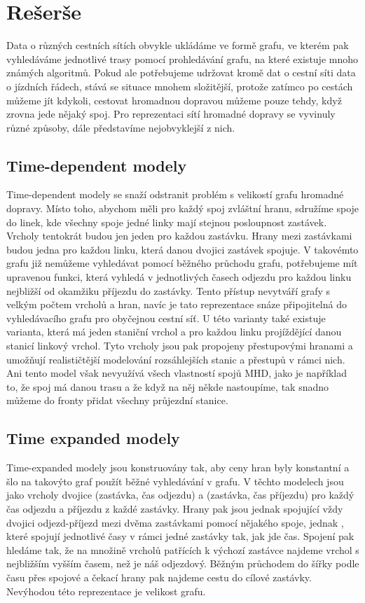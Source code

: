 \chapter{Rešerše}
Data o různých cestních sítích obvykle ukládáme ve formě grafu, ve kterém pak
vyhledáváme jednotlivé trasy pomocí prohledávání grafu, na které existuje mnoho
známých algoritmů. Pokud ale potřebujeme udržovat kromě dat o cestní síti data o
jízdních řádech, stává se situace mnohem složitější, protože zatímco po cestách
můžeme jít kdykoli, cestovat hromadnou dopravou můžeme pouze tehdy, když zrovna
jede nějaký spoj. Pro reprezentaci sítí hromadné dopravy se vyvinuly různé
způsoby, dále představíme nejobvyklejší z nich.

\section{Time-dependent modely}
Time-dependent modely \cite{time-dependent} se snaží odstranit problém s
velikostí grafu hromadné dopravy. Místo toho, abychom měli pro každý spoj
zvláštní hranu, sdružíme spoje do linek, kde všechny spoje jedné linky mají
stejnou posloupnost zastávek. Vrcholy tentokrát budou jen jeden pro každou
zastávku. Hrany mezi zastávkami budou jedna pro každou linku, která danou
dvojici zastávek spojuje. V takovémto grafu již nemůžeme vyhledávat pomocí
běžného průchodu grafu, potřebujeme mít upravenou funkci, která vyhledá v
jednotlivých časech odjezdu pro každou linku nejbližší od okamžiku příjezdu do
zastávky. Tento přístup nevytváří grafy s velkým počtem vrcholů a hran, navíc je
tato reprezentace snáze připojitelná do vyhledávacího grafu pro obyčejnou cestní
síť. U této varianty také existuje varianta, která má jeden staniční vrchol a
pro každou linku projíždějící danou stanicí linkový vrchol. Tyto vrcholy jsou
pak propojeny přestupovými hranami a umožňují realističtější modelování
rozsáhlejších stanic a přestupů v rámci nich. Ani tento model však nevyužívá
všech vlastností spojů MHD, jako je například to, že spoj má danou trasu a že
když na něj někde nastoupíme, tak snadno můžeme do fronty přidat všechny
průjezdní stanice.  

\section{Time expanded modely}
Time-expanded modely \cite{time-expanded} jsou konstruovány tak, aby ceny hran
byly konstantní a šlo na takovýto graf použít běžné vyhledávání v grafu. V
těchto modelech jsou jako vrcholy dvojice (zastávka, čas odjezdu) a (zastávka,
čas příjezdu) pro každý čas odjezdu a příjezdu z každé zastávky. Hrany pak
jsou jednak  spojující vždy dvojici odjezd-příjezd mezi dvěma
zastávkami pomocí nějakého spoje, jednak , které spojují jednotlivé
časy v rámci jedné zastávky tak, jak jde čas. Spojení pak hledáme tak, že na
množině vrcholů patřících k výchozí zastávce najdeme vrchol s nejbližším vyšším
časem, než je náš odjezdový. Běžným průchodem do šířky podle času přes spojové a
čekací hrany pak najdeme cestu do cílové zastávky. Nevýhodou této reprezentace
je velikost grafu.

